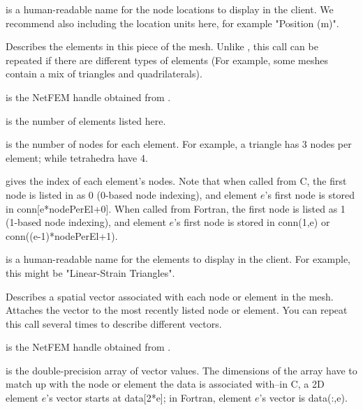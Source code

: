 \documentclass[10pt]{article}
\begin{document}
 is a human-readable name for the node locations
to display in the client.  We recommend also including the location
units here, for example "Position (m)".



Describes the elements in this piece of the mesh.
Unlike , this call can be repeated
if there are different types of elements (For example, 
some meshes contain a mix of triangles and quadrilaterals).

 is the NetFEM handle obtained from .

 is the number of elements listed here.

 is the number of nodes for each element.
For example, a triangle has 3 nodes per element; while 
tetrahedra have 4.

 gives the index of each element's nodes.  Note
that when called from C, the first node is listed in 
 as 0 (0-based node indexing), and element $e$'s
first node is stored in conn[e*nodePerEl+0].
When called from Fortran, the first node is listed as 1 
(1-based node indexing), and element $e$'s first node is
stored in conn(1,e) or conn((e-1)*nodePerEl+1).

 is a human-readable name for the elements
to display in the client.  For example, this might be
"Linear-Strain Triangles".




Describes a spatial vector associated with each node or element
in the mesh.  Attaches the vector to the most recently listed 
node or element.  You can repeat this call several times to 
describe different vectors.

 is the NetFEM handle obtained from .

 is the double-precision array of vector values.
The dimensions of the array have to match up with the node
or element the data is associated with--in C, a 2D element $e$'s
vector starts at data[2*e]; in Fortran, element $e$'s 
vector is data(:,e).
\end{document}
